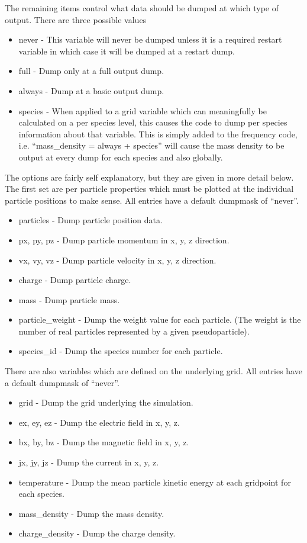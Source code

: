 \documentclass[12pt,a4paper]{article}
\begin{document}
The remaining items control what data should be dumped at which type of
output. There are three possible values\\
\begin{itemize}
\item never - This variable will never be dumped unless it is a required restart
  variable in which case it will be dumped at a restart dump.
\item full - Dump only at a full output dump.
\item always - Dump at a basic output dump.
\item species - When applied to a grid variable which can meaningfully be
  calculated on a per species level, this causes the code to dump per species
  information about that variable. This is simply added to the frequency code,
  i.e. ``mass\_density = always + species'' will cause the mass density to be
  output at every dump for each species and also globally.
\end{itemize}

The options are fairly self explanatory, but they are given in more detail
below. The first set are per particle properties which must be plotted at the
individual particle positions to make sense. All entries have a default
dumpmask of ``never''.\\
\begin{itemize}
\item particles - Dump particle position data.
\item px, py, pz - Dump particle momentum in x, y, z direction.
\item vx, vy, vz - Dump particle velocity in x, y, z direction.
\item charge - Dump particle charge.
\item mass - Dump particle mass.
\item particle\_weight - Dump the weight value for each particle. (The weight
  is the number of real particles represented by a given pseudoparticle).
\item species\_id - Dump the species number for each particle.
\end{itemize}

There are also variables which are defined on the underlying grid. All entries
have a default dumpmask of ``never''.\\
\begin{itemize}
\item grid - Dump the grid underlying the simulation.
\item ex, ey, ez - Dump the electric field in x, y, z.
\item bx, by, bz - Dump the magnetic field in x, y, z.
\item jx, jy, jz - Dump the current in x, y, z.
\item temperature - Dump the mean particle kinetic energy at each gridpoint
  for each species.
\item mass\_density - Dump the mass density.
\item charge\_density - Dump the charge density.
\end{itemize}
\end{document}
